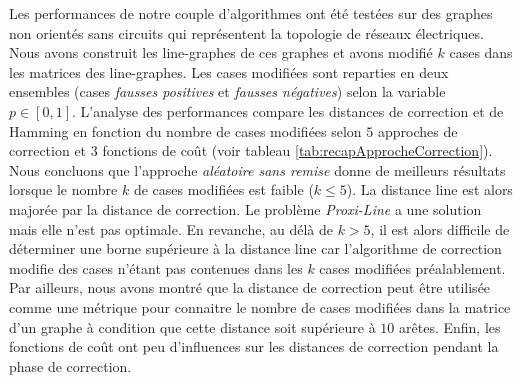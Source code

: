 
Les performances de notre couple d'algorithmes ont \'et\'e test\'ees sur des graphes non orient\'es sans circuits qui repr\'esentent la topologie de r\'eseaux \'electriques. Nous avons construit les line-graphes de ces graphes et avons modifi\'e $k$ cases dans les matrices des line-graphes. Les cases modifi\'ees sont reparties en deux ensembles (cases {\em fausses positives} et {\em fausses n\'egatives}) selon la variable $p \in [0,1]$.
L'analyse des performances compare les distances de correction et de Hamming en fonction du nombre de cases modifi\'ees selon $5$ approches de correction et $3$ fonctions de co\^ut (voir tableau \ref{tab:recapApprocheCorrection}). 
Nous concluons que l'approche {\em al\'eatoire sans remise} donne de meilleurs r\'esultats lorsque le nombre $k$ de cases modifi\'ees est faible ($k\le 5$). La distance line est alors major\'ee par la distance de correction.  Le probl\`eme {\em Proxi-Line} a une solution mais elle n'est pas optimale.
En revanche, au d\'el\`a de $k > 5$, il est alors difficile de d\'eterminer une borne sup\'erieure \`a la distance line car l'algorithme de correction  modifie des cases n'\'etant pas contenues dans les $k$ cases modifi\'ees pr\'ealablement. 
Par ailleurs, nous avons montr\'e que la distance de correction peut \^etre utilis\'ee comme une m\'etrique pour connaitre le nombre de cases modifi\'ees dans la matrice d'un graphe \`a condition que cette distance soit sup\'erieure \`a $10$ ar\^etes. 
Enfin, les fonctions de co\^ut ont peu d'influences sur les distances de correction pendant la phase de correction.

